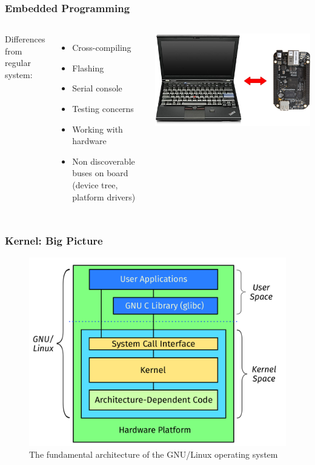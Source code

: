 \documentclass[aspectratio=169]{beamer}
\begin{document}
\begin{frame}
  \frametitle{Embedded Programming}
  \begin{columns}
      Differences from regular system:
      \begin{itemize}
        \item Cross-compiling
        \item Flashing
        \item Serial console
        \item Testing concerns
        \item Working with hardware
        \item Non discoverable buses on board (device tree, platform drivers)
      \end{itemize}
      \includegraphics[scale=0.27]{images/host-target.jpg}
  \end{columns}
\end{frame}

\begin{frame}
  \frametitle{Kernel: Big Picture}
  \vspace*{-5mm} %
  \begin{figure}
    \centering
    \includegraphics[scale=0.24]{images/linux-architecture.pdf}
    \caption{The fundamental architecture of the GNU/Linux operating system}
  \end{figure}
  \vspace*{-5mm} %
\end{frame}
\end{document}
